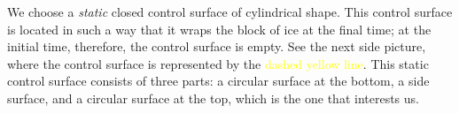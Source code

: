 \documentclass[a4paper,12pt,%
onecolumn,oneside,%
british%
]{memoir}
\renewcommand*{\|}[1][]{\nonscript\:#1\vert\nonscript\:\mathopen{}}
\begin{document}
We choose a \emph{static} closed control surface of cylindrical shape.
This control surface is located in such a way that it wraps the block of ice at the final time; at the initial time, therefore, the control surface is empty. See the next side picture, where the control surface is represented by the \textcolor{yellow}{dashed yellow line}.
%
%
This static control surface consists of three parts: a circular surface at the bottom, a side surface, and a circular surface at the top, which is the one that interests us.
\end{document}
